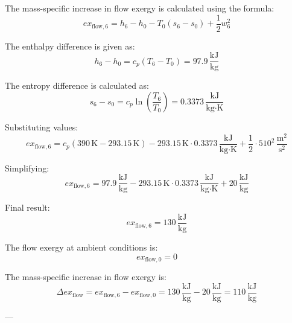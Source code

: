 The mass-specific increase in flow exergy is calculated using the formula:  
\[
ex_{\text{flow},6} = h_6 - h_0 - T_0 (s_6 - s_0) + \frac{1}{2} w_6^2
\]  

The enthalpy difference is given as:  
\[
h_6 - h_0 = c_p (T_6 - T_0) = 97.9 \, \frac{\text{kJ}}{\text{kg}}
\]  

The entropy difference is calculated as:  
\[
s_6 - s_0 = c_p \ln \left( \frac{T_6}{T_0} \right) = 0.3373 \, \frac{\text{kJ}}{\text{kg·K}}
\]  

Substituting values:  
\[
ex_{\text{flow},6} = c_p (390 \, \text{K} - 293.15 \, \text{K}) - 293.15 \, \text{K} \cdot 0.3373 \, \frac{\text{kJ}}{\text{kg·K}} + \frac{1}{2} \cdot 510^2 \, \frac{\text{m}^2}{\text{s}^2}
\]  

Simplifying:  
\[
ex_{\text{flow},6} = 97.9 \, \frac{\text{kJ}}{\text{kg}} - 293.15 \, \text{K} \cdot 0.3373 \, \frac{\text{kJ}}{\text{kg·K}} + 20 \, \frac{\text{kJ}}{\text{kg}}
\]  

Final result:  
\[
ex_{\text{flow},6} = 130 \, \frac{\text{kJ}}{\text{kg}}
\]  

The flow exergy at ambient conditions is:  
\[
ex_{\text{flow},0} = 0
\]  

The mass-specific increase in flow exergy is:  
\[
\Delta ex_{\text{flow}} = ex_{\text{flow},6} - ex_{\text{flow},0} = 130 \, \frac{\text{kJ}}{\text{kg}} - 20 \, \frac{\text{kJ}}{\text{kg}} = 110 \, \frac{\text{kJ}}{\text{kg}}
\]  

---